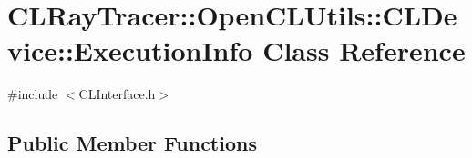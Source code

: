 \hypertarget{class_c_l_ray_tracer_1_1_open_c_l_utils_1_1_c_l_device_1_1_execution_info}{}\section{C\+L\+Ray\+Tracer\+:\+:Open\+C\+L\+Utils\+:\+:C\+L\+Device\+:\+:Execution\+Info Class Reference}
\label{class_c_l_ray_tracer_1_1_open_c_l_utils_1_1_c_l_device_1_1_execution_info}


{\ttfamily \#include $<$C\+L\+Interface.\+h$>$}

\subsection*{Public Member Functions}
